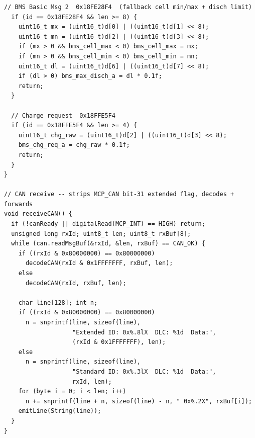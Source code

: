 \begin{lstlisting}[caption={BMS CAN frame decoder --- all five frame types}, label={lst:fw-can}]
  // BMS Basic Msg 2  0x18FE28F4  (fallback cell min/max + disch limit)
  if (id == 0x18FE28F4 && len >= 8) {
    uint16_t mx = (uint16_t)d[0] | ((uint16_t)d[1] << 8);
    uint16_t mn = (uint16_t)d[2] | ((uint16_t)d[3] << 8);
    if (mx > 0 && bms_cell_max < 0) bms_cell_max = mx;
    if (mn > 0 && bms_cell_min < 0) bms_cell_min = mn;
    uint16_t dl = (uint16_t)d[6] | ((uint16_t)d[7] << 8);
    if (dl > 0) bms_max_disch_a = dl * 0.1f;
    return;
  }

  // Charge request  0x18FFE5F4
  if (id == 0x18FFE5F4 && len >= 4) {
    uint16_t chg_raw = (uint16_t)d[2] | ((uint16_t)d[3] << 8);
    bms_chg_req_a = chg_raw * 0.1f;
    return;
  }
}

// CAN receive -- strips MCP_CAN bit-31 extended flag, decodes + forwards
void receiveCAN() {
  if (!canReady || digitalRead(MCP_INT) == HIGH) return;
  unsigned long rxId; uint8_t len; uint8_t rxBuf[8];
  while (can.readMsgBuf(&rxId, &len, rxBuf) == CAN_OK) {
    if ((rxId & 0x80000000) == 0x80000000)
      decodeCAN(rxId & 0x1FFFFFFF, rxBuf, len);
    else
      decodeCAN(rxId, rxBuf, len);

    char line[128]; int n;
    if ((rxId & 0x80000000) == 0x80000000)
      n = snprintf(line, sizeof(line),
                   "Extended ID: 0x%.8lX  DLC: %1d  Data:",
                   (rxId & 0x1FFFFFFF), len);
    else
      n = snprintf(line, sizeof(line),
                   "Standard ID: 0x%.3lX  DLC: %1d  Data:",
                   rxId, len);
    for (byte i = 0; i < len; i++)
      n += snprintf(line + n, sizeof(line) - n, " 0x%.2X", rxBuf[i]);
    emitLine(String(line));
  }
}
\end{lstlisting}

